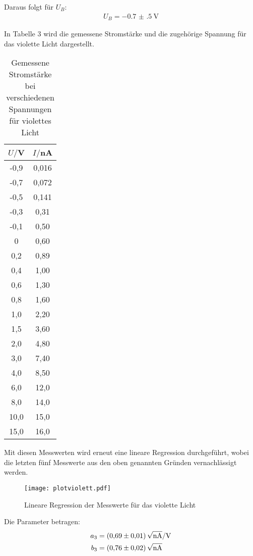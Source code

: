 Daraus folgt für $U_B$:
\begin{align*}
  U_B = \SI{-0.7(5)}{\volt}
\end{align*}


In Tabelle 3 wird die gemessene Stromstärke und die zugehörige Spannung für das violette Licht dargestellt.

\begin{table}[H]
  \centering
  \caption{Gemessene Stromstärke bei verschiedenen Spannungen für violettes Licht}
  \label{tab:Spannungsamplitude}
  \begin{tabular}{c c}
    \toprule
    $U/$V & $I/$nA \\
    \midrule
    -0,9 &	0,016 \\
    -0,7 &	0,072 \\
    -0,5 &	0,141 \\
    -0,3 &	0,31 \\
    -0,1 &	0,50 \\
    0	   &  0,60 \\
    0,2	 &  0,89 \\
    0,4	 &  1,00 \\
    0,6	 &  1,30 \\
    0,8	 &  1,60 \\
    1,0  &  2,20 \\
    1,5	 &  3,60 \\
    2,0  &  4,80 \\
    3,0  &  7,40 \\
    4,0	 &  8,50 \\
    6,0	 &  12,0 \\
    8,0	 &  14,0 \\
    10,0 &  15,0 \\
    15,0 &  16,0 \\
    \bottomrule
  \end{tabular}
\end{table}

Mit diesen Messwerten wird erneut eine lineare Regression durchgeführt, wobei die letzten fünf Messwerte
aus den oben genannten Gründen vernachlässigt werden.


\begin{figure}[H]
  \centering
  \texttt{[image: plotviolett.pdf]}
  \caption{Lineare Regression der Messwerte für das violette Licht}
  \label{fig:plot}
\end{figure}


Die Parameter betragen:
\begin{align*}
  a_3 &= \SI{0.69(1)}{\sqrt{\nano\ampere}\per\volt} \\
  b_3 &= \SI{0.76(2)}{\sqrt{\nano\ampere}}
\end{align*}

